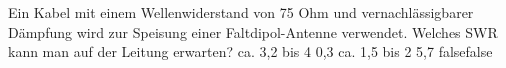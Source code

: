     {Ein Kabel mit einem Wellenwiderstand von 75 Ohm und vernachlässigbarer Dämpfung wird zur Speisung einer Faltdipol-Antenne verwendet. Welches SWR kann man auf der Leitung erwarten?}
    {ca. 3,2 bis 4}
    {0,3}
    {ca. 1,5 bis 2}
    {5,7}
    {false}{false}